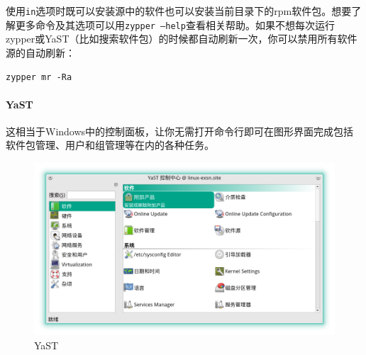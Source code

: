 \documentclass[11pt,openany]{book}
\newcommand{\command}[1]{\texttt{\textcolor{codec}{#1}}}
\newcommand{\zy}{zypper或YaST}
\begin{document}
使用\command{in}选项时既可以安装源中的软件也可以安装当前目录下的rpm软件包。想要了解更多命令及其选项可以用\command{zypper --help}查看相关帮助。如果不想每次运行\zy （比如搜索软件包）的时候都自动刷新一次，你可以禁用所有软件源的自动刷新：
\begin{Verbatim}[formatcom=\color{codec}]
    zypper mr -Ra
\end{Verbatim}

\paragraph{YaST} 这相当于Windows中的控制面板，让你无需打开命令行即可在图形界面完成包括软件包管理、用户和组管理等在内的各种任务。
\begin{figure}[htbp!]
\centering
\includegraphics[width=\textwidth]{./pic/yast.png} 
\caption{YaST}\label{yast}
\end{figure}
\end{document}
